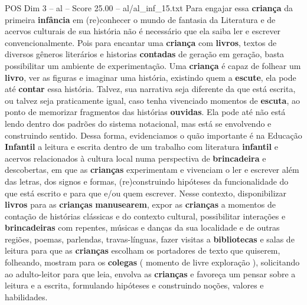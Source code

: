 \begin{textsample}{POS Dim 3 – al – Score 25.00 – al/al\_inf\_15.txt}
Para engajar essa \textbf{criança} da primeira \textbf{infância} em (re)conhecer o mundo de fantasia da Literatura e de acervos culturais de sua história não é necessário que ela saiba ler e escrever convencionalmente.
Pois para encantar uma \textbf{criança} com \textbf{livros}, textos de diversos gêneros literários e historias \textbf{contadas} de geração em geração, basta possibilitar um ambiente de experimentação.
Uma \textbf{criança} é capaz de folhear um \textbf{livro}, ver as figuras e imaginar uma história, existindo quem a \textbf{escute}, ela pode até \textbf{contar} essa história.
Talvez, sua narrativa seja diferente da que está escrita, ou talvez seja praticamente igual, caso tenha vivenciado momentos de \textbf{escuta}, ao ponto de memorizar fragmentos das histórias \textbf{ouvidas}.
Ela pode até não está lendo dentro dos padrões do sistema notacional, mas está se envolvendo e construindo sentido.
Dessa forma, evidenciamos o quão importante é na Educação \textbf{Infantil} a leitura e escrita dentro de um trabalho com literatura \textbf{infantil} e acervos relacionados à cultura local numa perspectiva de \textbf{brincadeira} e descobertas, em que as \textbf{crianças} experimentam e vivenciam o ler e escrever além das letras, dos signos e formas, (re)construindo hipóteses da funcionalidade do que está escrito e para que e/ou quem escrever.
Nesse contexto, disponibilizar \textbf{livros} para as \textbf{crianças} \textbf{manusearem}, expor as \textbf{crianças} a momentos de contação de histórias clássicas e do contexto cultural, possibilitar interações e \textbf{brincadeiras} com repentes, músicas e danças da sua localidade e de outras regiões, poemas, parlendas, travas-línguas, fazer visitas a \textbf{bibliotecas} e salas de leitura para que as \textbf{crianças} escolham os portadores de texto que quiserem, folheando, mostram para os \textbf{colegas} ( momento de livre exploração ), solicitando ao adulto-leitor para que leia, envolva as \textbf{crianças} e favoreça um pensar sobre a leitura e a escrita, formulando hipóteses e construindo noções, valores e habilidades.

\end{textsample}
